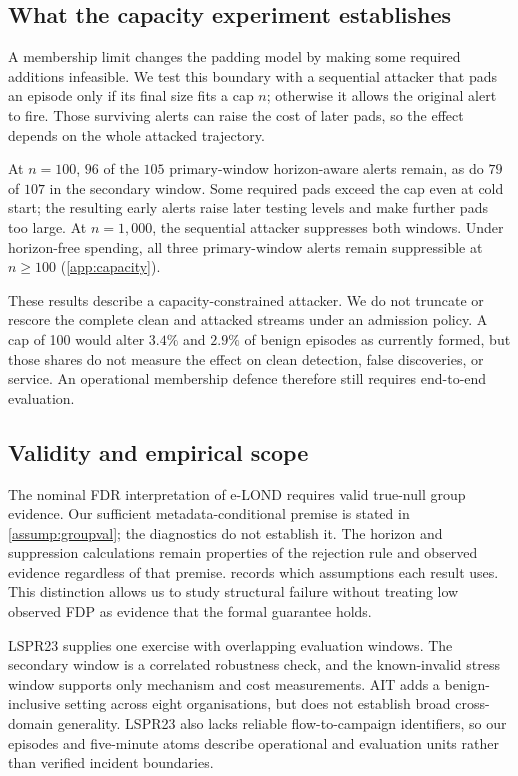 \documentclass[conference]{IEEEtran}
\begin{document}
\subsection{What the capacity experiment establishes}\label{sec:capacity}

A membership limit changes the padding model by making some required additions infeasible.
We test this boundary with a sequential attacker that pads an episode only if its final size fits
a cap $n$; otherwise it allows the original alert to fire. Those surviving alerts can raise the
cost of later pads, so the effect depends on the whole attacked trajectory.

At $n=100$, $96$ of the $105$ primary-window horizon-aware alerts remain, as do $79$ of $107$
in the secondary window. Some required pads exceed the cap even at cold start; the resulting
early alerts raise later testing levels and make further pads too large. At $n=1{,}000$, the
sequential attacker suppresses both windows. Under horizon-free spending, all three primary-window
alerts remain suppressible at $n\ge100$ (\cref{app:capacity}).

These results describe a capacity-constrained attacker. We do not truncate or rescore the complete
clean and attacked streams under an admission policy. A cap of 100 would alter $3.4\%$ and
$2.9\%$ of benign episodes as currently formed, but those shares do not measure the effect on
clean detection, false discoveries, or service. An operational membership defence therefore still
requires end-to-end evaluation.

\subsection{Validity and empirical scope}\label{sec:dependency}\label{sec:limitations}

The nominal FDR interpretation of e-LOND requires valid true-null group evidence. Our sufficient
metadata-conditional premise is stated in \cref{assump:groupval}; the diagnostics do not establish
it. The horizon and suppression calculations remain properties of the rejection rule and observed
evidence regardless of that premise.  records which assumptions each result uses.
This distinction allows us to study structural failure without treating low observed FDP as
evidence that the formal guarantee holds.

LSPR23 supplies one exercise with overlapping evaluation windows. The secondary window is a
correlated robustness check, and the known-invalid stress window supports only mechanism and cost
measurements. AIT adds a benign-inclusive setting across eight organisations, but does not establish
broad cross-domain generality. LSPR23 also lacks reliable flow-to-campaign identifiers, so our
episodes and five-minute atoms describe operational and evaluation units rather than verified
incident boundaries.
\end{document}

